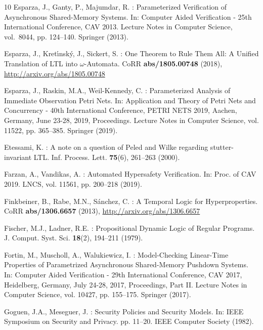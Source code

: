 \documentclass[10pt,a4paper]{article}
\begin{document}
\begin{thebibliography}{10}
	Esparza, J., Ganty, P., Majumdar, R.
	: {Parameterized Verification of Asynchronous Shared-Memory Systems}.
	In: Computer Aided Verification - 25th International Conference, {CAV} 2013.
	Lecture Notes in Computer Science, vol.~8044, pp.
	124--140.
	Springer (2013).

	Esparza, J., Kret{\'{\i}}nsk{\'{y}}, J., Sickert, S.
	: {One Theorem to Rule Them All: {A}
	Unified Translation of {LTL} into {\(\omega\)}-Automata}.
	CoRR \textbf{abs/1805.00748} (2018), \url{http://arxiv.org/abs/1805.00748}

	 Esparza, J., Raskin, M.A., Weil{-}Kennedy, C.
	: {Parameterized Analysis of Immediate Observation Petri Nets}.
	In: Application and Theory of Petri Nets and Concurrency - 40th International Conference, {PETRI} {NETS} 2019, Aachen, Germany, June 23-28, 2019, Proceedings.
	Lecture Notes in Computer Science, vol.
	11522, pp. 365--385.
	Springer (2019).

	Etessami, K.
	: {A note on a question of Peled and Wilke regarding stutter-invariant {LTL}}.
	Inf.
	Process.
	Lett.
	\textbf{75}(6),  261--263 (2000). 

	Farzan, A., Vandikas, A.
	: {Automated Hypersafety Verification}.
	In: Proc.
	of CAV 2019.
	LNCS, vol.
	11561, pp. 200--218 (2019). 

	Finkbeiner, B., Rabe, M.N., S{\'{a}}nchez, C.
	: {A Temporal Logic for Hyperproperties}.
	CoRR \textbf{abs/1306.6657} (2013), \url{http://arxiv.org/abs/1306.6657}

	 Fischer, M.J., Ladner, R.E.
	: {Propositional Dynamic Logic of Regular Programs}.
	J.
	Comput.
	Syst.
	Sci.
	\textbf{18}(2),  194--211 (1979). 

	Fortin, M., Muscholl, A., Walukiewicz, I.
	: {Model-Checking Linear-Time Properties of Parametrized Asynchronous Shared-Memory Pushdown Systems}.
	In: Computer Aided Verification - 29th International Conference, {CAV} 2017, Heidelberg, Germany, July 24-28, 2017, Proceedings, Part {II}.
	Lecture Notes in Computer Science, vol.
	10427, pp. 155--175.
	Springer (2017).

	Goguen, J.A., Meseguer, J.
	: {Security Policies and Security Models}.
	In: {IEEE} Symposium on Security and Privacy.
	pp. 11--20. {IEEE}
	Computer Society (1982).


\end{thebibliography}
\end{document}
